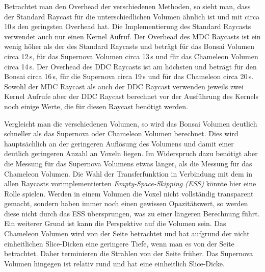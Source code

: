 Betrachtet man den Overhead der verschiedenen Methoden, so sieht man, dass der Standard Raycast für die unterschiedlichen Volumen ähnlich ist und mit circa 10\,s den geringsten Overhead hat.
Die Implementierung des Standard Raycasts verwendet auch nur einen Kernel Aufruf.
Der Overhead des MDC Raycasts ist ein wenig höher als der des Standard Raycasts und beträgt für das Bonsai Volumen circa 12\,s, für das Supernova Volumen circa 13\,s und für das Chameleon Volumen circa 14\,s.
Der Overhead des DDC Raycasts ist am höchsten und beträgt für den Bonsai circa 16\,s, für die Supernova circa 19\,s und für das Chameleon circa 20\,s.
Sowohl der MDC Raycast als auch der DDC Raycast verwenden jeweils zwei Kernel Aufrufe aber der DDC Raycast berechnet vor der Ausführung des Kernels noch einige Werte, die für diesen Raycast benötigt werden.

Vergleicht man die verschiedenen Volumen, so wird das Bonsai Volumen deutlich schneller als das Supernova oder Chameleon Volumen berechnet.
Dies wird hauptsächlich an der geringeren Auflösung des Volumens und damit einer deutlich geringeren Anzahl an Voxeln liegen.
Im Widerspruch dazu benötigt aber die Messung für das Supernova Volumens etwas länger, als die Messung für das Chameleon Volumen.
Die Wahl der Transferfunktion in Verbindung mit dem in allen Raycasts vorimplementierten \emph{Empty-Space-Skipping (ESS)} könnte hier eine Rolle spielen.
Werden in einem Volumen die Voxel nicht vollständig transparent gemacht, sondern haben immer noch einen gewissen Opazitätswert, so werden diese nicht durch das ESS übersprungen, was zu einer längeren Berechnung führt.
Ein weiterer Grund ist kann die Perspektive auf die Volumen sein.
Das Chameleon Volumen wird von der Seite betrachtet und hat aufgrund der nicht einheitlichen Slice-Dicken eine geringere Tiefe, wenn man es von der Seite betrachtet.
Daher terminieren die Strahlen von der Seite früher.
Das Supernova Volumen hingegen ist relativ rund und hat eine einheitlich Slice-Dicke.


